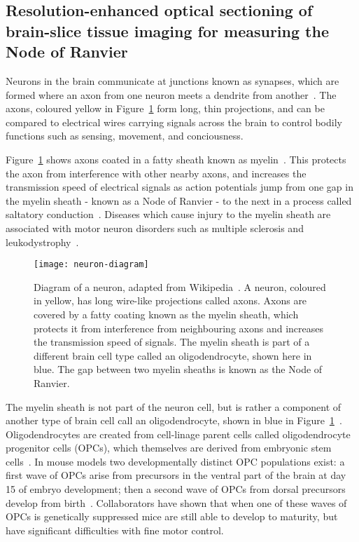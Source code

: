 \subsection{Resolution-enhanced optical sectioning of brain-slice tissue imaging for measuring the Node of Ranvier}
Neurons in the brain communicate at junctions known as synapses, which are formed where an axon from one neuron meets a dendrite from another~\cite{hall1992introduction}. 
The axons, coloured yellow in Figure~\ref{fig:neuron-diagram} form long, thin projections, and can be compared to electrical wires carrying signals across the brain to control bodily functions such as sensing, movement, and conciousness. 

Figure~\ref{fig:neuron-diagram} shows axons coated in a fatty sheath known as myelin~\cite{hall1992introduction}.
This protects the axon from interference with other nearby axons, and increases the transmission speed of electrical signals as action potentials jump from one gap in the myelin sheath - known as a Node of Ranvier - to the next in a process called saltatory conduction~\cite{tasaki1939electro}.
Diseases which cause injury to the myelin sheath are associated with motor neuron disorders such as multiple sclerosis and leukodystrophy~\cite{suzuki2001demyelinating}. 

\begin{figure}[htbp!]
\centering
\texttt{[image: neuron-diagram]}
\caption[LAG SIM: Diagram of a neuron showing an axon protected by the myelin sheath]{Diagram of a neuron, adapted from Wikipedia~\cite{wikineuron}. A neuron, coloured in yellow, has long wire-like projections called axons. Axons are covered by a fatty coating known as the myelin sheath, which protects it from interference from neighbouring axons and increases the transmission speed of signals. The myelin sheath is part of a different brain cell type called an oligodendrocyte, shown here in blue. The gap between two myelin sheaths is known as the Node of Ranvier. }
\label{fig:neuron-diagram}
\end{figure}

The myelin sheath is not part of the neuron cell, but is rather a component of another type of brain cell call an oligodendrocyte, shown in blue in Figure~\ref{fig:neuron-diagram}~\cite{hammond2012cellular}. 
Oligodendrocytes are created from cell-linage parent cells called oligodendrocyte progenitor cells (OPCs), which themselves are derived from embryonic stem cells~\cite{goldman2015make}. 
In mouse models two developmentally distinct OPC populations exist: a first wave of OPCs arise from precursors in the ventral part of the brain at day 15 of embryo development; then a second wave of OPCs from dorsal precursors develop from birth~\cite{kessaris2006competing}. 
Collaborators have shown that when one of these waves of OPCs is genetically suppressed mice are still able to develop to maturity, but have significant difficulties with fine motor control. 

